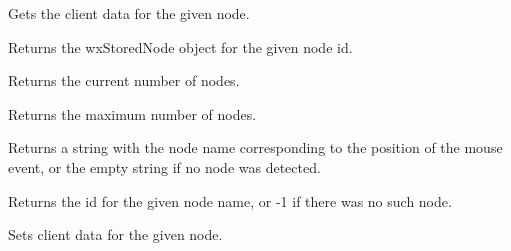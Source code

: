 
Gets the client data for the given node.

\label{wxstoredtreegetnode}


Returns the wxStoredNode object for the given node id.

\label{wxstoredtreegetnodecount}


Returns the current number of nodes.

\label{wxstoredtreegetnumnodes}


Returns the maximum number of nodes.

\label{wxstoredtreehittest}


Returns a string with the node name corresponding to the position of the mouse event, or the empty string if no node
was detected.

\label{wxstoredtreenametoid}


Returns the id for the given node name, or -1 if there was no such node.

\label{wxstoredtreesetclientdata}


Sets client data for the given node.


